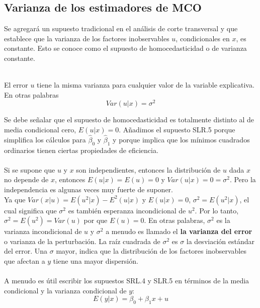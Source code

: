 \subsection{Varianza de los estimadores de MCO}
Se agregará un supuesto tradicional en el análisis de corte transversal y que establece que la varianza de los factores inobservables $u$, condicionales en $x$, es constante. Esto se conoce como el supuesto de homocedasticidad o de varianza constante.\\\\


\begin{tcolorbox}[title={Supuesto RLS.5. homocedasticidad},colback = white]
    El error $u$ tiene la misma varianza para cualquier valor de la variable explicativa. En otras palabras 
    $$Var(u|x) = \sigma^2$$
\end{tcolorbox}

Se debe señalar que el supuesto de homocedasticidad es totalmente distinto al de media condicional cero, $E(u|x) = 0$. Añadimos el supuesto SLR.5 porque simplifica los cálculos para $\hat{\beta}_0$ y $\hat{\beta}_1$ y porque implica que los mínimos cuadrados ordinarios tienen ciertas propiedades de eficiencia.\\\\ 
Si se supone que $u$ y $x$ son independientes, entonces la distribución de $u$ dada $x$ no depende de $x$, entonces $E(u|x) = E(u) = 0$ y $Var(u|x) = 0 = \sigma^2$. Pero la independencia es algunas veces muy fuerte de suponer.\\
Ya que $Var(x|u) = E(u^2|x) - E^2(u|x)$ y $E(u|x) = 0$, $\sigma^2 = E(u^2|x)$, el cual significa que $\sigma^2$  es también esperanza incondicional de $u^2$. Por lo tanto, $\sigma^2 = E(u^2) = Var(u)$ por que $E(u) = 0$. En otras palabras, $\sigma^2$ es la varianza incondicional de $u$ y $\sigma^2$ a menudo es llamado el \textbf{la varianza del error} o varianza de la perturbación. La raíz cuadrada de $\sigma^2$ es $\sigma$ la desviación estándar del error. Una $\sigma$ mayor, indica que la distribución de los factores inobservables que afectan a $y$ tiene una mayor dispersión.\\\\

A menudo es útil escribir los supuestos SRL.4 y SLR.5 en términos de la media condicional y la varianza condicional de $y$:
\begin{equation}
    E(y|x) = \beta_0 + \beta_1 x + u
\end{equation}

